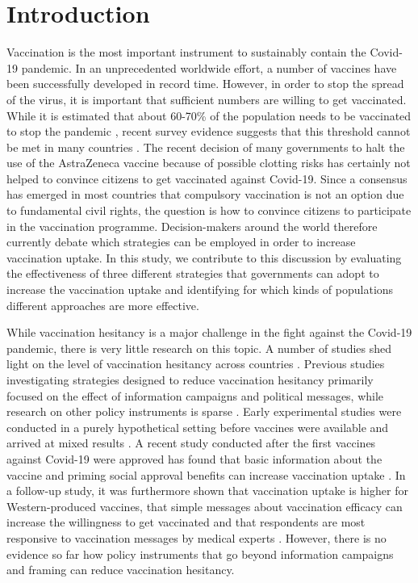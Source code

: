 \documentclass[12pt]{article}
\renewcommand\hl[1]{#1}
\begin{document}
\section*{Introduction}
Vaccination is the most important instrument to sustainably contain the Covid-19 pandemic. In an unprecedented worldwide effort, a number of vaccines have been successfully developed in record time. However, in order to stop the spread of the virus, it is important that sufficient numbers are willing to get vaccinated. While it is estimated that about 60-70\% of the population needs to be vaccinated to stop the pandemic \cite{Aschwanden2020,Randolph2020}, recent survey evidence suggests that this threshold cannot be met in many countries \cite{Lazarus2020,Sallam2021}. The recent decision of many governments to halt the use of the AstraZeneca vaccine because of possible clotting risks has certainly not helped to convince citizens to get vaccinated against Covid-19. Since a consensus has emerged in most countries that compulsory vaccination is not an option due to fundamental civil rights, the question is how to convince citizens to participate in the vaccination programme. Decision-makers around the world therefore currently debate which strategies can be employed in order to increase vaccination uptake. In this study, we contribute to this discussion by evaluating the effectiveness of three different strategies that governments can adopt to increase the vaccination uptake and identifying for which kinds of populations different approaches are more effective. 

While vaccination hesitancy is a major challenge in the fight against the Covid-19 pandemic, there is very little research on this topic. A number of studies shed light on the level of vaccination hesitancy  across countries \cite{Lazarus2020,Loewen2021,Sallam2021}. Previous studies investigating strategies designed to reduce vaccination hesitancy primarily focused on the effect of information campaigns and political messages, \hl{while research on other policy instruments is sparse} \cite{Duquette2020,Rieger2020,Argote2021a}. Early experimental studies were conducted in a purely hypothetical setting before vaccines were available and arrived at mixed results \cite{Duquette2020,Rieger2020}. A recent study conducted after the first vaccines against Covid-19 were approved  has found that basic information about the vaccine and priming social approval benefits can increase vaccination uptake \cite{Argote2021a}. In a follow-up study, it was  furthermore shown that vaccination uptake is higher for Western-produced vaccines, that simple messages about vaccination efficacy can increase the willingness to get vaccinated and that respondents are most responsive to vaccination messages by medical experts \cite{Argote2021b}. However, there is no evidence so far how policy instruments that go beyond information campaigns and framing can reduce vaccination hesitancy. %
\end{document}
